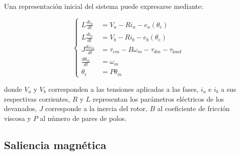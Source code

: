 Una representación inicial del sistema puede expresarse mediante:

\begin{equation}
\label{eq:modelo_motor}
\left\{
\begin{aligned}
    L \frac{d i_{a}}{dt} &= V_{a} - R i_{a} - e_{a}(\theta_{e}) \\
    L \frac{d i_{b}}{dt} &= V_{b} - R i_{b} - e_{b}(\theta_{e}) \\
    J \frac{d \omega_{m}}{dt} &= 
    \tau_{em} - B \omega_{m} - \tau_{dm} - \tau_{load} \\
    \frac{d \theta_{m}}{dt} &= \omega_{m} \\
    \theta_{e} &= P\theta_{m}
\end{aligned}
\right.
\end{equation}

donde $V_a$ y $V_b$ corresponden a las tensiones aplicadas a las fases,
$i_a$ e $i_b$ a sus respectivas corrientes, $R$ y $L$ representan los
parámetros eléctricos de los devanados, $J$ corresponde a la inercia del
rotor, $B$ al coeficiente de fricción viscosa y $P$ al número de pares de
polos.

%



\subsection{Saliencia magnética}

%
%
%
%

